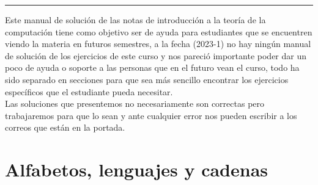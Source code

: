 \documentclass[12pt,a4paper]{book}
\begin{document}
\renewcommand{\contentsname}{\vspace{1cm} Contenido \vspace{-2cm} }


\begin{titlepage}
\vspace*{2cm}

\noindent
\vspace*{0.5cm}

\vspace{1.5cm}
\null\vfill
\vspace*{1cm}
\noindent
\hfill
\begin{minipage}{0.7\linewidth}
    \begin{flushright}
        \printauthor
    \end{flushright}
\end{minipage}
%
\begin{minipage}{0.02\linewidth}
    \rule{1pt}{140pt}
\end{minipage}
\titlepagedecoration
\end{titlepage}

Este manual de solución de las notas de introducción a la teoría de la computación tiene como objetivo ser de ayuda para estudiantes que se encuentren viendo la materia en futuros semestres, a la fecha (2023-1) no hay ningún manual de solución de los ejercicios de este curso y nos pareció importante poder dar un poco de ayuda o soporte a las personas que en el futuro vean el curso, todo ha sido separado en secciones para que sea más sencillo encontrar los ejercicios específicos que el estudiante pueda necesitar.\\

Las soluciones que presentemos no necesariamente son correctas pero trabajaremos para que lo sean y ante cualquier error nos pueden escribir a los correos que están en la portada.\\

\tableofcontents
\cleardoublepage


\chapter{Alfabetos, lenguajes y cadenas}

\end{document}
